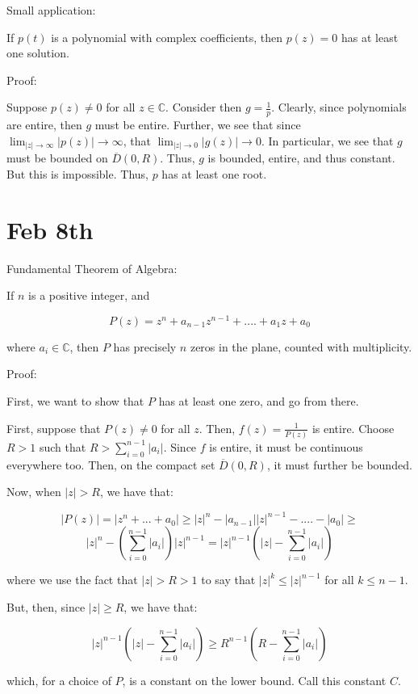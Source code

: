 \documentclass[10pt]{article}
\begin{document}
Small application:

If $p(t)$ is a polynomial with complex coefficients, then $p(z) = 0$ has at least one solution.

Proof:

Suppose $p(z) \not = 0$ for all $z \in \mathbb{C}$. Consider then $g = \frac{1}{p}$. Clearly, since polynomials are entire, then $g$ must be entire. Further, we see that since $\lim_{|z| \to \infty} |p(z)| \to \infty$, that $\lim_{|z| \to 0} |g(z)| \to 0$. In particular, we see that $g$ must be bounded on $\overline{D}(0,R)$. Thus, $g$ is bounded, entire, and thus constant. But this is impossible. Thus, $p$ has at least one root.

\section*{Feb 8th}

Fundamental Theorem of Algebra:

If $n$ is a positive integer, and

$$P(z)  = z^n + a_{n-1} z^{n-1} + .... + a_1 z + a_0 $$

where $a_i \in \mathbb{C}$, then $P$ has precisely $n$ zeros in the plane, counted with multiplicity.

Proof:

First, we want to show that $P$ has at least one zero, and go from there.

First, suppose that $P(z) \not = 0$ for all $z$. Then, $f(z) = \frac{1}{P(z)} $ is entire. Choose $R> 1$ such that $R > \sum_{i=0}^{n-1} |a_i| $. Since $f$ is entire, it must be continuous everywhere too. Then, on the compact set $\overline{D}(0,R)$, it must further be bounded. 

Now, when $|z| > R$, we have that:

$$|P(z)| = | z^n + ... + a_0 | \geq |z|^n - |a_{n-1}| |z|^{n-1} - .... - |a_0| \geq $$
$$|z|^n - \left( \sum_{i=0}^{n-1} |a_i| \right) |z|^{n-1}  = |z|^{n-1} \left( |z| - \sum_{i=0}^{n-1} |a_i| \right)$$

where we use the fact that $|z| > R > 1$ to say that $|z|^k \leq |z|^{n-1}$ for all $k \leq n-1$.

But, then, since $|z| \geq R$, we have that:

$$ |z|^{n-1} \left( |z| - \sum_{i=0}^{n-1} |a_i| \right) \geq R^{n-1} \left( R - \sum_{i=0}^{n-1} |a_i| \right)$$

which, for a choice of $P$, is a constant on the lower bound. Call this constant $C$.
\end{document}
